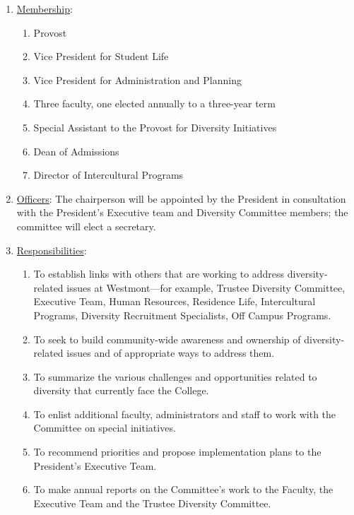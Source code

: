					\begin{enumerate}[label=\alph*)]
						\item{\underline{Membership}:
							\begin{enumerate}[label=\arabic*)]
								\item{Provost}
								\item{Vice President for Student Life}
								\item{Vice President for Administration and Planning}
								\item{Three faculty, one elected annually to a three-year term}
								\item{Special Assistant to the Provost for Diversity Initiatives}
								\item{Dean of Admissions}
								\item{Director of Intercultural Programs}
							\end{enumerate}
						}
						\item{\underline{Officers}:
							The chairperson will be appointed by the President in consultation with the President's Executive team and Diversity Committee members; the committee will elect a secretary.}
						\item{\underline{Responsibilities}:
							\begin{enumerate}[label=\arabic*)]
								\item{To establish links with others that are working to address diversity-related issues at Westmont---for example, Trustee Diversity Committee, Executive Team, Human Resources, Residence Life, Intercultural Programs, Diversity Recruitment Specialists, Off Campus Programs.}
								\item{To seek to build community-wide awareness and ownership of diversity-related issues and of appropriate ways to address them.}
								\item{To summarize the various challenges and opportunities related to diversity that currently face the College.}
								\item{To enlist additional faculty, administrators and staff to work with the Committee on special initiatives.}
								\item{To recommend priorities and propose implementation plans to the President's Executive Team.}
								\item{To make annual reports on the Committee's work to the Faculty, the Executive Team and the Trustee Diversity Committee.}
							\end{enumerate}
						}
					\end{enumerate}
